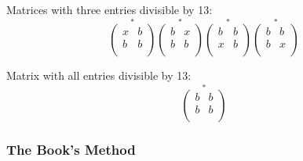 \documentclass[12pt]{article}
\begin{document}
Matrices with three entries divisible by 13:
\[
\stackrel{*}
{
\left(\begin{matrix}
x & b \\
b & b \\
\end{matrix}\right)
}
\stackrel{*}
{
\left(\begin{matrix}
b & x \\
b & b \\
\end{matrix}\right)
}
\stackrel{*}
{
\left(\begin{matrix}
b & b \\
x & b \\
\end{matrix}\right)
}
\stackrel{*}
{
\left(\begin{matrix}
b & b \\
b & x \\
\end{matrix}\right)
}
\]

Matrix with all entries divisible by 13:
\[
\stackrel{*}
{
\left(\begin{matrix}
b & b \\
b & b \\
\end{matrix}\right)
}
\]

\subsubsection*{The Book's Method}
\end{document}
